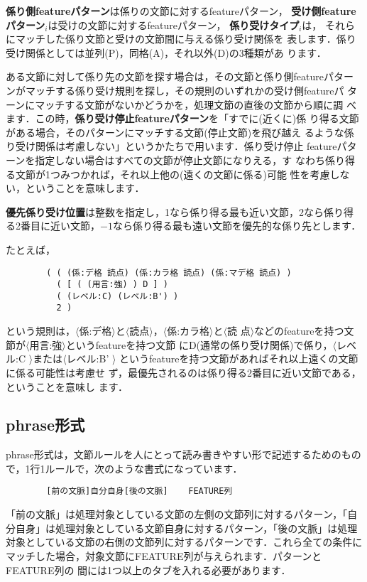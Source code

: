 \documentclass[a4j,11pt,titlepage]{jarticle}
\def\fl{$\langle$}
\def\fr{$\rangle$}
\begin{document}
{\bf 係り側featureパターン}は係りの文節に対するfeatureパターン，
{\bf 受け側featureパターン$_i$}は受けの文節に対するfeatureパターン，
{\bf 係り受けタイプ$_i$}は，
それらにマッチした係り文節と受けの文節間に与える係り受け関係を
表します．係り受け関係としては並列(P)，同格(A)，それ以外(D)の3種類があ
ります．

ある文節に対して係り先の文節を探す場合は，その文節と係り側featureパター
ンがマッチする係り受け規則を探し，その規則のいずれかの受け側featureパ
ターンにマッチする文節がないかどうかを，処理文節の直後の文節から順に調
べます．この時，{\bf 係り受け停止featureパターン}を「すでに(近くに)係
り得る文節がある場合，そのパターンにマッチする文節(停止文節)を飛び越え
るような係り受け関係は考慮しない」というかたちで用います．係り受け停止
featureパターンを指定しない場合はすべての文節が停止文節になりえる，す
なわち係り得る文節が1つみつかれば，それ以上他の(遠くの文節に係る)可能
性を考慮しない，ということを意味します．

{\bf 優先係り受け位置}は整数を指定し，1なら係り得る最も近い文節，2なら係り得
る2番目に近い文節，$-1$なら係り得る最も遠い文節を優先的な係り先とします．

たとえば，
\begin{verbatim}
        ( ( (係:デ格 読点) (係:カラ格 読点) (係:マデ格 読点) )
          ( [ ( (用言:強) ) D ] )
          ( (レベル:C) (レベル:B') )
          2 )
\end{verbatim}
という規則は，\fl 係:デ格\fr と\fl 読点\fr ，\fl 係:カラ格\fr と\fl 読
点\fr などのfeatureを持つ文節が\fl 用言:強\fr というfeatureを持つ文節
にD(通常の係り受け関係)で係り，\fl レベル:C \fr または\fl レベル:B' \fr 
というfeatureを持つ文節があればそれ以上遠くの文節に係る可能性は考慮せ
ず，最優先されるのは係り得る2番目に近い文節である，ということを意味し
ます．


\subsection{phrase形式}
\label{rule::phrase}

phrase形式は，文節ルールを人にとって読み書きやすい形で記述するためのもの
で，1行1ルールで，次のような書式になっています．
\begin{verbatim}
        [前の文脈]自分自身[後の文脈]    FEATURE列
\end{verbatim}
「前の文脈」は処理対象としている文節の左側の文節列に対するパターン，「自
分自身」は処理対象としている文節自身に対するパターン，「後の文脈」は処理
対象としている文節の右側の文節列に対するパターンです．これら全ての条件に
マッチした場合，対象文節にFEATURE列が与えられます．パターンとFEATURE列の
間には1つ以上のタブを入れる必要があります．
\end{document}
